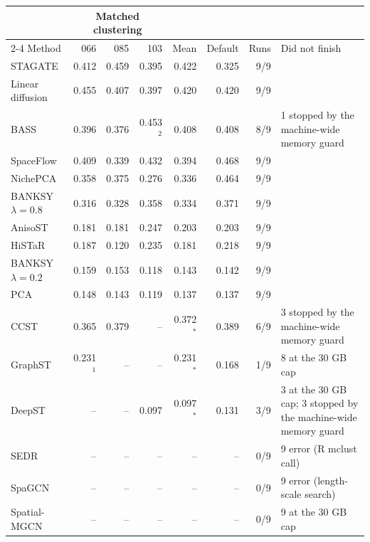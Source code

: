 \begin{tabular}{lrrrrrrl}
\toprule
 & \multicolumn{3}{c}{Matched clustering} & & & & \\ \cmidrule(lr){2-4}
Method & 066 & 085 & 103 & Mean & Default & Runs & Did not finish \\
\midrule
STAGATE & 0.412 & 0.459 & 0.395 & 0.422 & 0.325 & 9/9 &  \\
Linear diffusion & 0.455 & 0.407 & 0.397 & 0.420 & 0.420 & 9/9 &  \\
BASS & 0.396 & 0.376 & 0.453$^{2}$ & 0.408 & 0.408 & 8/9 & 1 stopped by the machine-wide memory guard \\
SpaceFlow & 0.409 & 0.339 & 0.432 & 0.394 & 0.468 & 9/9 &  \\
NichePCA & 0.358 & 0.375 & 0.276 & 0.336 & 0.464 & 9/9 &  \\
BANKSY $\lambda=0.8$ & 0.316 & 0.328 & 0.358 & 0.334 & 0.371 & 9/9 &  \\
AnisoST & 0.181 & 0.181 & 0.247 & 0.203 & 0.203 & 9/9 &  \\
HiSTaR & 0.187 & 0.120 & 0.235 & 0.181 & 0.218 & 9/9 &  \\
BANKSY $\lambda=0.2$ & 0.159 & 0.153 & 0.118 & 0.143 & 0.142 & 9/9 &  \\
PCA & 0.148 & 0.143 & 0.119 & 0.137 & 0.137 & 9/9 &  \\
CCST & 0.365 & 0.379 & -- & 0.372$^*$ & 0.389 & 6/9 & 3 stopped by the machine-wide memory guard \\
GraphST & 0.231$^{1}$ & -- & -- & 0.231$^*$ & 0.168 & 1/9 & 8 at the 30 GB cap \\
DeepST & -- & -- & 0.097 & 0.097$^*$ & 0.131 & 3/9 & 3 at the 30 GB cap; 3 stopped by the machine-wide memory guard \\
SEDR & -- & -- & -- & -- & -- & 0/9 & 9 error (R mclust call) \\
SpaGCN & -- & -- & -- & -- & -- & 0/9 & 9 error (length-scale search) \\
Spatial-MGCN & -- & -- & -- & -- & -- & 0/9 & 9 at the 30 GB cap \\
\bottomrule
\end{tabular}
